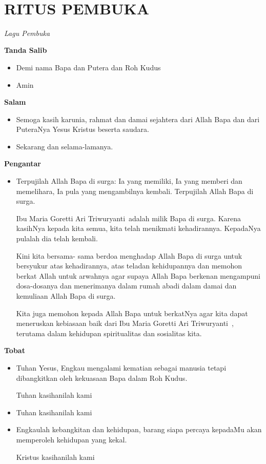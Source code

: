 \documentclass[a5paper,headsepline,titlepage,11pt,normalheadings,DIVcalc]{scrbook}
\makeatletter
\newcommand{\subjudul}[1]{%
  {\parindent \z@ 
    \interlinepenalty\@M \bfseries #1\par\nobreak \vskip 10\p@ }}
\newcommand{\lagu}[1]{%
  {\parindent \z@ 
    \interlinepenalty\@M \slshape \mdseries \Large \textit{#1}\par\nobreak \vskip 10\p@ }}
\newcommand{\BU}[1]{\begin{itemize} \item[U:] #1 \end{itemize}}
\newcommand{\BI}[1]{\begin{itemize} \item[I:] #1 \end{itemize}}
\newcommand{\namaalm}{Ibu Maria Goretti Ari Triwuryanti~}
\makeatother
\begin{document}
\newpage
\thispagestyle{empty}
{~}
\newpage

\section*{RITUS PEMBUKA} 

 

\lagu{Lagu Pembuka}  
%
 

\subjudul{Tanda Salib} 

\BI{Demi nama  Bapa dan Putera dan Roh Kudus}

\BU{Amin}

 

\subjudul{Salam}

\BI{Semoga kasih karunia, rahmat dan damai sejahtera dari 
Allah Bapa dan dari PuteraNya Yesus Kristus beserta 
saudara.} 

\BU{Sekarang dan selama-lamanya.}

 

\subjudul{Pengantar}

\BI{Terpujilah Allah Bapa di surga: Ia yang memiliki, Ia yang 
memberi dan memelihara, Ia pula yang mengambilnya 
kembali. Terpujilah Allah Bapa di surga.

\namaalm adalah milik Bapa di surga. Karena kasihNya 
kepada kita semua, kita telah menikmati kehadirannya.
KepadaNya pulalah dia telah 
kembali.

Kini kita bersama-
sama berdoa menghadap Allah Bapa di surga untuk 
bersyukur atas kehadirannya, atas teladan kehidupannya 
dan memohon berkat Allah untuk arwahnya 
agar supaya Allah Bapa berkenan mengampuni dosa-dosanya 
dan menerimanya dalam rumah abadi dalam 
damai dan kemuliaan Allah Bapa di surga. 

Kita juga memohon kepada Allah Bapa untuk berkatNya 
agar kita dapat meneruskan kebiasaan baik dari \namaalm , 
terutama dalam kehidupan spiritualitas dan 
sosialitas kita.}

 

\subjudul{Tobat}

\BI{Tuhan Yesus, Engkau mengalami kematian sebagai manusia tetapi dibangkitkan oleh kekuasaan Bapa dalam Roh Kudus.

Tuhan kasihanilah kami}

\BU{Tuhan kasihanilah kami}

\BI{Engkaulah kebangkitan dan kehidupan, barang siapa percaya kepadaMu akan memperoleh kehidupan yang kekal.

Kristus kasihanilah kami}
\end{document}
